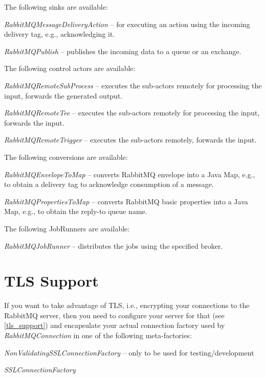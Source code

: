 \documentclass[a4paper]{book}
\begin{document}
\noindent The following sinks are available:
\begin{tight_itemize}
  \item \textit{RabbitMQMessageDeliveryAction} -- for executing an action using
  the incoming delivery tag, e.g., acknowledging it.
  \item \textit{RabbitMQPublish} -- publishes the incoming data to a queue
  or an exchange.
\end{tight_itemize}

\noindent The following control actors are available:
\begin{tight_itemize}
  \item \textit{RabbitMQRemoteSubProcess} -- executes the sub-actors remotely
  for processing the input, forwards the generated output.
  \item \textit{RabbitMQRemoteTee} -- executes the sub-actors remotely
  for processing the input, forwards the input.
  \item \textit{RabbitMQRemoteTrigger} -- executes the sub-actors remotely,
  forwards the input.
\end{tight_itemize}

\noindent The following conversions are available:
\begin{tight_itemize}
  \item \textit{RabbitMQEnvelopeToMap} -- converts RabbitMQ envelope into a
  Java Map, e.g., to obtain a delivery tag to acknowledge consumption of a message.
  \item \textit{RabbitMQPropertiesToMap} -- converts RabbitMQ basic properties
  into a Java Map, e.g., to obtain the reply-to queue name.
\end{tight_itemize}

\noindent The following JobRunners are available:
\begin{tight_itemize}
  \item \textit{RabbitMQJobRunner} -- distributes the jobs using the specified
  broker.
\end{tight_itemize}

\section{TLS Support}
If you want to take advantage of TLS, i.e., encrypting your connections to
the RabbitMQ server, then you need to configure your server for that (see
\ref{tls_support}) and encapsulate your actual connection factory used by
\textit{RabbitMQConnection} in one of the following meta-factories:
\begin{tight_itemize}
  \item \textit{NonValidatingSSLConnectionFactory} -- only to be used for testing/development
  \item \textit{SSLConnectionFactory}
\end{tight_itemize}
\end{document}
